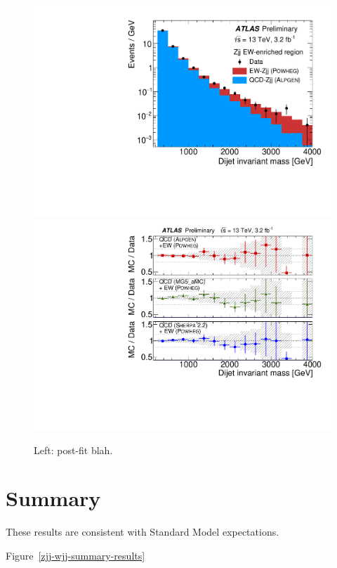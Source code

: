 \documentclass{PoS}
\begin{document}
\begin{figure}
  \includegraphics[width=.49\textwidth]{STDM-2016-09/fig_04a.pdf}
  \includegraphics[width=.49\textwidth]{STDM-2016-09/fig_04b.pdf}
  \caption{Left: post-fit blah.}
  \label{zjj-dijet-post-fit}
\end{figure}

\section{Summary}

These results are consistent with Standard Model expectations.

Figure~\ref{zjj-wjj-summary-results}
\end{document}
